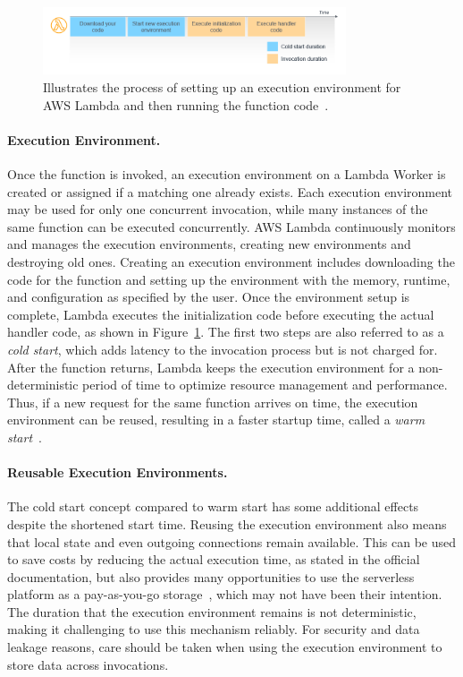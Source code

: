 \begin{figure}[ht!]
  \begin{center}
      \includegraphics[width=0.8\textwidth]{figures/lambda_invoke.png}
      \caption{Illustrates the process of setting up an execution environment for AWS Lambda and then running the function code~\cite{noauthor_operating_2021}.}
      \label{fig:lambda_invoke}
  \end{center}
\end{figure}

\paragraph{Execution Environment.} Once the function is invoked, an execution environment on a Lambda Worker is created or assigned if a matching one already exists. Each execution environment may be used for only one concurrent invocation, while many instances of the same function can be executed concurrently. AWS Lambda continuously monitors and manages the execution environments, creating new environments and destroying old ones. Creating an execution environment includes downloading the code for the function and setting up the environment with the memory, runtime, and configuration as specified by the user. Once the environment setup is complete, Lambda executes the initialization code before executing the actual handler code, as shown in Figure~\ref{fig:lambda_invoke}. The first two steps are also referred to as a \emph{cold start}, which adds latency to the invocation process but is not charged for. After the function returns, Lambda keeps the execution environment for a non-deterministic period of time to optimize resource management and performance. Thus, if a new request for the same function arrives on time, the execution environment can be reused, resulting in a faster startup time, called a \emph{warm start}~\cite{noauthor_security_nodate, noauthor_operating_2021}.

\paragraph{Reusable Execution Environments.} The cold start concept compared to warm start has some additional effects despite the shortened start time. Reusing the execution environment also means that local state and even outgoing connections remain available. This can be used to save costs by reducing the actual execution time, as stated in the official documentation, but also provides many opportunities to use the serverless platform as a pay-as-you-go storage~\cite{wang_infinicache_2020}, which may not have been their intention. The duration that the execution environment remains is not deterministic, making it challenging to use this mechanism reliably. For security and data leakage reasons, care should be taken when using the execution environment to store data across invocations.

